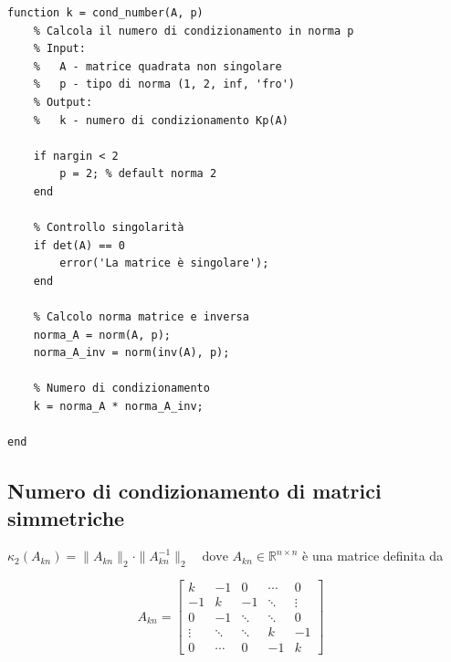 \documentclass[12pt,a4paper]{article}
\begin{document}
\begin{lstlisting}
function k = cond_number(A, p)
    % Calcola il numero di condizionamento in norma p
    % Input:
    %   A - matrice quadrata non singolare
    %   p - tipo di norma (1, 2, inf, 'fro')
    % Output:
    %   k - numero di condizionamento Kp(A)
    
    if nargin < 2
        p = 2; % default norma 2
    end
    
    % Controllo singolarità
    if det(A) == 0
        error('La matrice è singolare');
    end
    
    % Calcolo norma matrice e inversa
    norma_A = norm(A, p);
    norma_A_inv = norm(inv(A), p);
    
    % Numero di condizionamento
    k = norma_A * norma_A_inv;
    
end
\end{lstlisting}


\newpage
\subsection*{Numero di condizionamento di matrici simmetriche}

\begin{flushleft}
$\displaystyle
\kappa_2(A_{kn}) = \|A_{kn}\|_2 \cdot \|A_{kn}^{-1}\|_2 \quad \text{dove } A_{kn} \in \mathbb{R}^{n \times n}
$ è una matrice definita da
\end{flushleft}

\[
A_{kn} = 
\begin{bmatrix}
k & -1 & 0 & \cdots & 0 \\
-1 & k & -1 & \ddots & \vdots \\
0 & -1 & \ddots & \ddots & 0 \\
\vdots & \ddots & \ddots & k & -1 \\
0 & \cdots & 0 & -1 & k
\end{bmatrix}
\quad 
\]
\vspace{0.5em}
\end{document}
